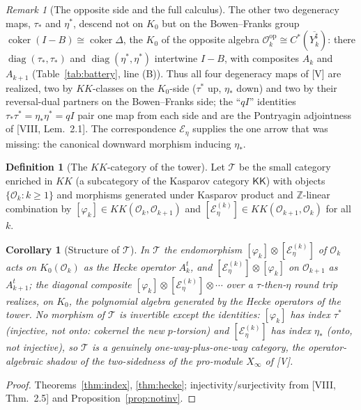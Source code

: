 \documentclass[11pt]{amsart}
\numberwithin{equation}{section}
\newtheorem{corollary}[theorem]{Corollary}
\theoremstyle{definition}
\newtheorem{definition}[theorem]{Definition}
\theoremstyle{remark}
\newtheorem{remark}[theorem]{Remark}
\newcommand{\Z}{\mathbb{Z}}
\newcommand{\cO}{\mathcal{O}}
\newcommand{\cE}{\mathcal{E}}
\newcommand{\KK}{\mathit{KK}}
\newcommand{\coker}{\operatorname{coker}}
\newcommand{\ta}{\tau_*}
\newcommand{\taup}{\tau^*}
\newcommand{\et}{\eta_*}
\newcommand{\etp}{\eta^*}
\newcommand{\Ysh}[1]{Y_{#1}^{\sharp}}
\begin{document}
\begin{remark}[The opposite side and the full calculus]\label{rem:opposite}
The other two degeneracy maps, $\ta$ and $\etp$, descend not on $K_0$ but on the
Bowen--Franks group $\coker(I-B)\cong\coker\Delta$, the $K_0$ of the opposite algebra
$\cO_k^{\mathrm{op}}\cong C^*(\overline{\Ysh{k}})$: there
$\operatorname{diag}(\ta,\ta)$ and $\operatorname{diag}(\etp,\etp)$ intertwine $I-B$, with
composites $A_k$ and $A_{k+1}$ (Table~\ref{tab:battery}, line (B)). Thus all four
degeneracy maps of [V] are realized, two by $\KK$-classes on the $K_0$-side ($\taup$ up,
$\et$ down) and two by their reversal-dual partners on the Bowen--Franks side; the
``$qI$'' identities $\ta\taup=\et\etp=qI$ pair one map from each side and are the
Pontryagin adjointness of [VIII, Lem.~2.1]. The correspondence $\cE_\eta$ supplies the one
arrow that was missing: the canonical downward morphism inducing $\et$.
\end{remark}

\begin{definition}[The $\KK$-category of the tower]\label{def:cat}
Let $\mathcal{T}$ be the small category enriched in $\KK$ (a subcategory of the Kasparov
category $\mathsf{KK}$) with objects $\{\cO_k:k\ge1\}$ and morphisms generated under
Kasparov product and $\Z$-linear combination by $[\varphi_k]\in\KK(\cO_k,\cO_{k+1})$ and
$[\cE_\eta^{(k)}]\in\KK(\cO_{k+1},\cO_k)$ for all $k$.
\end{definition}

\begin{corollary}[Structure of $\mathcal{T}$]\label{cor:cat}
In $\mathcal{T}$ the endomorphism $[\varphi_k]\otimes[\cE_\eta^{(k)}]$ of $\cO_k$ acts on
$K_0(\cO_k)$ as the Hecke operator $A_k^{t}$, and $[\cE_\eta^{(k)}]\otimes[\varphi_k]$ on
$\cO_{k+1}$ as $A_{k+1}^{t}$; the diagonal composite
$[\varphi_k]\otimes[\cE_\eta^{(k)}]\otimes\cdots$ over a $\tau$-then-$\eta$ round trip
realizes, on $K_0$, the polynomial algebra generated by the Hecke operators of the tower.
No morphism of $\mathcal{T}$ is invertible except the identities: $[\varphi_k]$ has index
$\taup$ (injective, not onto: cokernel the new $p$-torsion) and $[\cE_\eta^{(k)}]$ has index
$\et$ (onto, not injective), so $\mathcal{T}$ is a genuinely one-way-plus-one-way category,
the operator-algebraic shadow of the two-sidedness of the pro-module $X_\infty$ of [V].
\end{corollary}

\begin{proof}
Theorems~\ref{thm:index}, \ref{thm:hecke}; injectivity/surjectivity from [VIII, Thm.~2.5]
and Proposition~\ref{prop:notinv}.
\end{proof}
\end{document}
